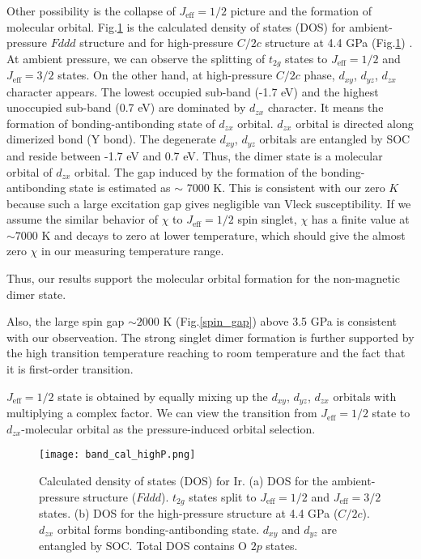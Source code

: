 Other possibility is the collapse of $J_{\mathrm{eff}} = 1/2$ picture and the formation of molecular orbital.
Fig.\ref{band_cal_highP} is the calculated density of states (DOS) for ambient-pressure $Fddd$ structure and for high-pressure $C/2c$ structure at 4.4 GPa (Fig.\ref{band_cal_highP})
\cite{takayama2018pressure}.
At ambient pressure, we can observe the splitting of $t_{2g}$ states to $J_{\mathrm{eff}} = 1/2$ and $J_{\mathrm{eff}} = 3/2$ states.
On the other hand, at high-pressure $C/2c$ phase, $d_{xy}$, $d_{yz}$, $d_{zx}$ character appears.
The lowest occupied sub-band (-1.7 eV) and the highest unoccupied sub-band (0.7 eV) are dominated by $d_{zx}$ character.
It means the formation of bonding-antibonding state of $d_{zx}$ orbital.
$d_{zx}$ orbital is directed along dimerized bond (Y bond).
The degenerate $d_{xy}$, $d_{yz}$ orbitals are entangled by SOC and reside between -1.7 eV and 0.7 eV.
Thus, the dimer state is a molecular orbital of $d_{zx}$ orbital.
The gap induced by the formation of the bonding-antibonding state is estimated as $\sim$ 7000 K.
This is consistent with our zero $K$ because such a large excitation gap gives negligible van Vleck susceptibility.
If we assume the similar behavior of $\chi$ to $J_{\mathrm{eff}} = 1/2$ spin singlet, $\chi$ has a finite value at $\sim 7000$ K and decays to zero at lower temperature,
which should give the almost zero $\chi$ in our measuring temperature range.

Thus, our results support the molecular orbital formation for the non-magnetic dimer state.

Also, the large spin gap $\sim 2000$ K (Fig.\ref{spin_gap}) above 3.5 GPa is consistent with our observeation.
The strong singlet dimer formation is further supported by the high transition temperature reaching to room temperature and the fact that it is first-order transition.

$J_{\mathrm{eff}} = 1/2$ state is obtained by equally mixing up the $d_{xy}$, $d_{yz}$, $d_{zx}$ orbitals with multiplying a complex factor.
We can view the transition from $J_{\mathrm{eff}} = 1/2$ state to $d_{zx}$-molecular orbital as the pressure-induced orbital selection.

\begin{figure}
  \centering
  \texttt{[image: band\_cal\_highP.png]}
  \caption{Calculated density of states (DOS) for Ir. \cite{takayama2018pressure}
  (a) DOS for the ambient-pressure structure ($Fddd$).
  $t_{2g}$ states split to $J_{\mathrm{eff}} = 1/2$ and $J_{\mathrm{eff}} = 3/2$ states.
  (b) DOS for the high-pressure structure at 4.4 GPa ($C/2c$).
  $d_{zx}$ orbital forms bonding-antibonding state.
  $d_{xy}$ and $d_{yz}$ are entangled by SOC.
  Total DOS contains O $2p$ states.}
  \label{band_cal_highP}
\end{figure}


